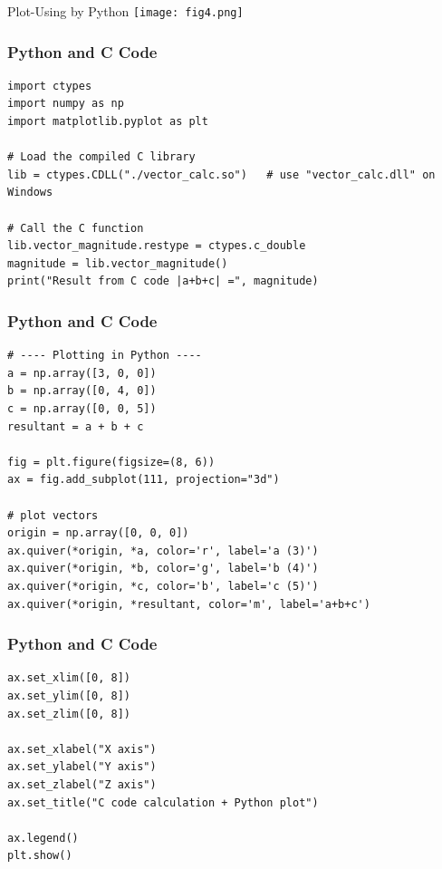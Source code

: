 \documentclass{beamer}
\begin{document}
\begin{frame}{Plot-Using by Python}
    \centering
    \texttt{[image: fig4.png]}     
\end{frame}


\begin{frame}[fragile]
\frametitle{Python and C Code}

\begin{lstlisting}
import ctypes
import numpy as np
import matplotlib.pyplot as plt

# Load the compiled C library
lib = ctypes.CDLL("./vector_calc.so")   # use "vector_calc.dll" on Windows

# Call the C function
lib.vector_magnitude.restype = ctypes.c_double
magnitude = lib.vector_magnitude()
print("Result from C code |a+b+c| =", magnitude)
\end{lstlisting}

\end{frame}
\begin{frame}[fragile]
\frametitle{Python and C Code}

\begin{lstlisting}
# ---- Plotting in Python ----
a = np.array([3, 0, 0])
b = np.array([0, 4, 0])
c = np.array([0, 0, 5])
resultant = a + b + c

fig = plt.figure(figsize=(8, 6))
ax = fig.add_subplot(111, projection="3d")

# plot vectors
origin = np.array([0, 0, 0])
ax.quiver(*origin, *a, color='r', label='a (3)')
ax.quiver(*origin, *b, color='g', label='b (4)')
ax.quiver(*origin, *c, color='b', label='c (5)')
ax.quiver(*origin, *resultant, color='m', label='a+b+c')
\end{lstlisting}

\end{frame}
\begin{frame}[fragile]
\frametitle{Python and C Code}

\begin{lstlisting}
ax.set_xlim([0, 8])
ax.set_ylim([0, 8])
ax.set_zlim([0, 8])

ax.set_xlabel("X axis")
ax.set_ylabel("Y axis")
ax.set_zlabel("Z axis")
ax.set_title("C code calculation + Python plot")

ax.legend()
plt.show()
\end{lstlisting}

\end{frame}
\end{document}
